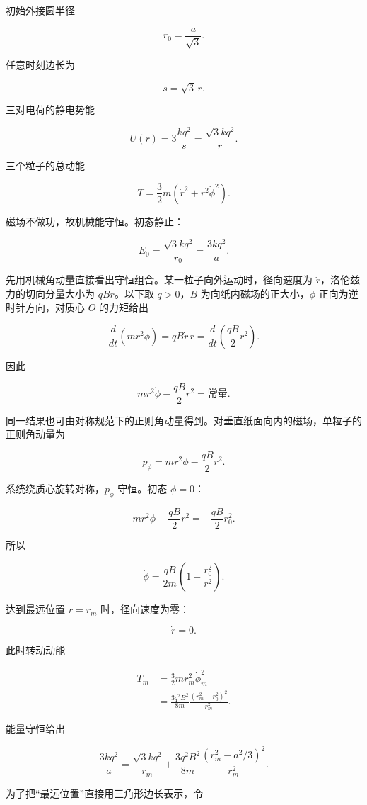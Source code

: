 \documentclass[12pt,a4paper,UTF8]{ctexart}
\begin{document}
初始外接圆半径

\[
r_0=\frac a{\sqrt3}.
\tag{2}
\]

任意时刻边长为

\[
s=\sqrt3\,r.
\tag{3}
\]

三对电荷的静电势能

\[
U(r)=3\frac{kq^2}{s}
=\frac{\sqrt3kq^2}{r}.
\tag{4}
\]

三个粒子的总动能

\[
T=\frac32m(\dot r^2+r^2\dot\phi^2).
\tag{5}
\]

磁场不做功，故机械能守恒。初态静止：

\[
E_0=\frac{\sqrt3kq^2}{r_0}
=\frac{3kq^2}{a}.
\tag{6}
\]

先用机械角动量直接看出守恒组合。某一粒子向外运动时，径向速度为
\(\dot r\)，洛伦兹力的切向分量大小为 \(qB\dot r\)。以下取 \(q>0\)，\(B\)
为向纸内磁场的正大小，\(\phi\) 正向为逆时针方向，对质心 \(O\) 的力矩给出

\[
\frac{d}{dt}(mr^2\dot\phi)
=qB\dot r\,r
=\frac{d}{dt}\left(\frac{qB}{2}r^2\right).
\]

因此

\[
mr^2\dot\phi-\frac{qB}{2}r^2
=\text{常量}.
\]

同一结果也可由对称规范下的正则角动量得到。对垂直纸面向内的磁场，单粒子的正则角动量为

\[
p_\phi
=mr^2\dot\phi-\frac{qB}{2}r^2.
\tag{7}
\]

系统绕质心旋转对称，\(p_\phi\) 守恒。初态 \(\dot\phi=0\)：

\[
mr^2\dot\phi-\frac{qB}{2}r^2
=-\frac{qB}{2}r_0^2.
\tag{8}
\]

所以

\[
\dot\phi
=\frac{qB}{2m}
\left(1-\frac{r_0^2}{r^2}\right).
\tag{9}
\]

达到最远位置 \(r=r_m\) 时，径向速度为零：

\[
\dot r=0.
\tag{10}
\]

此时转动动能

\[
\begin{aligned}
T_m
&=\frac32mr_m^2\dot\phi_m^2\\
&=\frac{3q^2B^2}{8m}
\frac{(r_m^2-r_0^2)^2}{r_m^2}.
\end{aligned}
\tag{11}
\]

能量守恒给出

\[
\boxed{
\frac{3kq^2}{a}
=\frac{\sqrt3kq^2}{r_m}
+\frac{3q^2B^2}{8m}
\frac{(r_m^2-a^2/3)^2}{r_m^2}
}.
\tag{12}
\]

为了把``最远位置''直接用三角形边长表示，令
\end{document}
